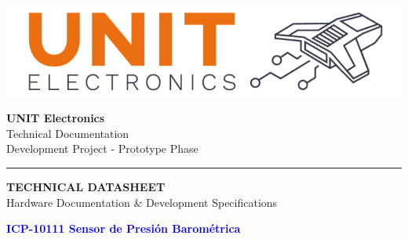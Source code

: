 \documentclass[11pt,a4paper]{article}
\begin{document}
\begin{titlepage}
    \centering
    
    \vspace*{0.5cm}
    
    \begin{minipage}{0.3\textwidth}
        \centering
        
        \includegraphics[width=\textwidth]{logo.png}
        
    \end{minipage}
    \hfill
    \begin{minipage}{0.6\textwidth}
        \raggedleft
        {\small \textbf{UNIT Electronics}}\\
        {\footnotesize Technical Documentation}\\
        {\footnotesize Development Project - Prototype Phase}
    \end{minipage}
    
    \vspace{0.5cm}
    
    {\color{blue}\rule{\textwidth}{2pt}}
    
    \vspace{1.5cm}
    
    \begin{tcolorbox}[
        colback=blue!5!white,
        colframe=blue!75!black,
        width=0.9\textwidth,
        arc=2mm,
        boxrule=1.5pt,
        halign=center
    ]
    {\Large \textbf{TECHNICAL DATASHEET}}\\[0.2cm]
    {\normalsize Hardware Documentation \& Development Specifications}
    \end{tcolorbox}
    
    \vspace{0.8cm}
    
    {\Huge \textbf{\textcolor{blue}{ICP-10111 Sensor de Presión Barométrica}}}\\[0.3cm]
    
    

\end{titlepage}
\end{document}
